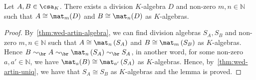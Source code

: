 \begin{lemma}
  \label{lem:common-div-alg}
Let $A, B \in \csa_{K}$. There exists a division $K$-algebra $D$ and non-zero $m,n\in\mathbb{N}$ such that $A\cong\mat_{m}(D)$ and $B\cong\mat_{n}(D)$ as $K$-algebras.
  \leanok
\end{lemma}

\begin{proof}
  By~\cref{thm:wed-artin-algebra}, we can find division algebras $S_{A}, S_{B}$ and non-zero $m, n\in\mathbb{N}$ such that $A\cong\mat_{n}\left(S_{A}\right)$ and $B\cong\mat_{m}\left(S_{B}\right)$ as $K$-algebras. Hence $B\sim_{\br}A\sim_{\br}\mat_{n}\left(S_{A}\right)\sim_{\br}S_{A}$, in another word, for some non-zero $a, a'\in\mathbb{N}$, we have $\mat_{a}(B)\cong\mat_{a'}\left(S_{A}\right)$ as $K$-algebras. Hence, by~\cref{thm:wed-artin-uniq}, we have that $S_{A}\cong S_{B}$ as $K$-algebras and the lemma is proved.
\end{proof}

